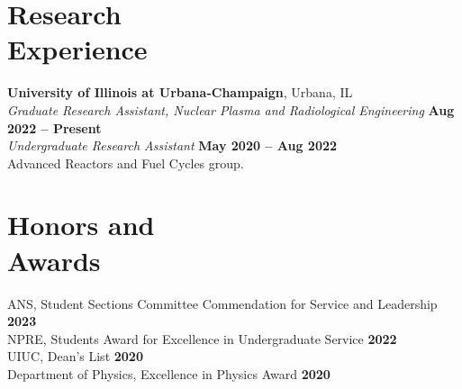 \documentclass[margin,line]{resume}
\begin{document}
\begin{resume}
    \section{\mysidestyle Research\\Experience}
    \textbf{University of Illinois at Urbana-Champaign}, Urbana, IL\\
                \textsl{Graduate Research Assistant, Nuclear Plasma and Radiological Engineering} \hfill \textbf{Aug 2022 -- Present}\\
                \textsl{Undergraduate Research Assistant} \hfill \textbf{May 2020 -- Aug 2022}\\
                Advanced Reactors and Fuel Cycles group.



    \section{\mysidestyle Honors and\\Awards}
                ANS, Student Sections Committee Commendation for Service and Leadership \hfill \textbf{2023}\vspace{.5mm}\\%
                NPRE, Students Award for Excellence in Undergraduate Service \hfill \textbf{2022}\vspace{.5mm}\\%
                UIUC, Dean's List \hfill \textbf{2020}\vspace{.5mm}\\%
                Department of Physics, Excellence in Physics Award \hfill \textbf{2020}\vspace{.5mm}\\%



\end{resume}
\end{document}
